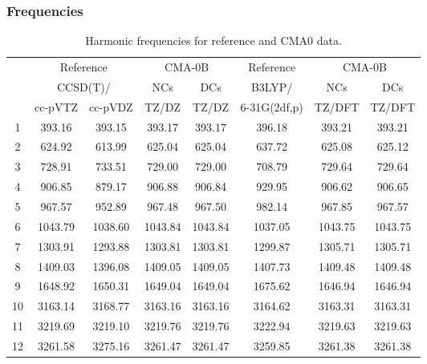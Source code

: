 \documentclass[10pt,oneside]{article}
\begin{document}
\subsubsection*{Frequencies}
\begin{table}[h!]
\centering
\caption{Harmonic frequencies for reference and CMA0 data.}
\begin{tabular}{cccccccc}
\toprule
{} & \multicolumn{2}{c}{Reference} & \multicolumn{2}{c}{CMA-0B} &    Reference & \multicolumn{2}{c}{CMA-0B} \\
{} & \multicolumn{2}{c}{CCSD(T)/} &     NCs &     DCs &       B3LYP/ &     NCs &     DCs \\
{} &   cc-pVTZ & cc-pVDZ &   TZ/DZ &   TZ/DZ & 6-31G(2df,p) &  TZ/DFT &  TZ/DFT \\
\midrule
1  &    393.16 &  393.15 &  393.17 &  393.17 &       396.18 &  393.21 &  393.21 \\
2  &    624.92 &  613.99 &  625.04 &  625.04 &       637.72 &  625.08 &  625.12 \\
3  &    728.91 &  733.51 &  729.00 &  729.00 &       708.79 &  729.64 &  729.64 \\
4  &    906.85 &  879.17 &  906.88 &  906.84 &       929.95 &  906.62 &  906.65 \\
5  &    967.57 &  952.89 &  967.48 &  967.50 &       982.14 &  967.85 &  967.57 \\
6  &   1043.79 & 1038.60 & 1043.84 & 1043.84 &      1037.05 & 1043.75 & 1043.75 \\
7  &   1303.91 & 1293.88 & 1303.81 & 1303.81 &      1299.87 & 1305.71 & 1305.71 \\
8  &   1409.03 & 1396.08 & 1409.05 & 1409.05 &      1407.73 & 1409.48 & 1409.48 \\
9  &   1648.92 & 1650.31 & 1649.04 & 1649.04 &      1675.62 & 1646.94 & 1646.94 \\
10 &   3163.14 & 3168.77 & 3163.16 & 3163.16 &      3164.62 & 3163.31 & 3163.31 \\
11 &   3219.69 & 3219.10 & 3219.76 & 3219.76 &      3222.94 & 3219.63 & 3219.63 \\
12 &   3261.58 & 3275.16 & 3261.47 & 3261.47 &      3259.85 & 3261.38 & 3261.38 \\
\bottomrule
\end{tabular}
\end{table}

\clearpage
\end{document}
